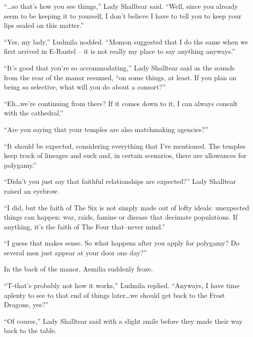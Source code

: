  

“…so that’s how you see things,” Lady Shalltear said. “Well, since you already seem to be keeping it to yourself, I don’t believe I have to tell you to keep your lips sealed on this matter.”

 

“Yes, my lady,” Ludmila nodded. “Momon suggested that I do the same when we first arrived in E-Rantel – it is not really my place to say anything anyways.”

 

“It’s good that you’re so accommodating,” Lady Shalltear said as the sounds from the rear of the manor resumed, “on some things, at least. If you plan on being so selective, what will you do about a consort?”

 

“Eh…we’re continuing from there? If it comes down to it, I can always consult with the cathedral.”

 

“Are you saying that your temples are also matchmaking agencies?”

 

“It should be expected, considering everything that I’ve mentioned. The temples keep track of lineages and such and, in certain scenarios, there are allowances for polygamy.”

 

“Didn’t you just say that faithful relationships are expected?” Lady Shalltear raised an eyebrow.

 

“I did, but the faith of The Six is not simply made out of lofty ideals: unexpected things can happen: war, raids, famine or disease that decimate populations. If anything, it’s the faith of The Four that–never mind.”

 

“I guess that makes sense. So what happens after you apply for polygamy? Do several men just appear at your door one day?”

 

In the back of the manor, Aemilia suddenly froze.

 

“T-that’s probably not how it works,” Ludmila replied. “Anyways, I have time aplenty to see to that end of things later…we should get back to the Frost Dragons, yes?”

 

“Of course,” Lady Shalltear said with a slight smile before they made their way back to the table.

